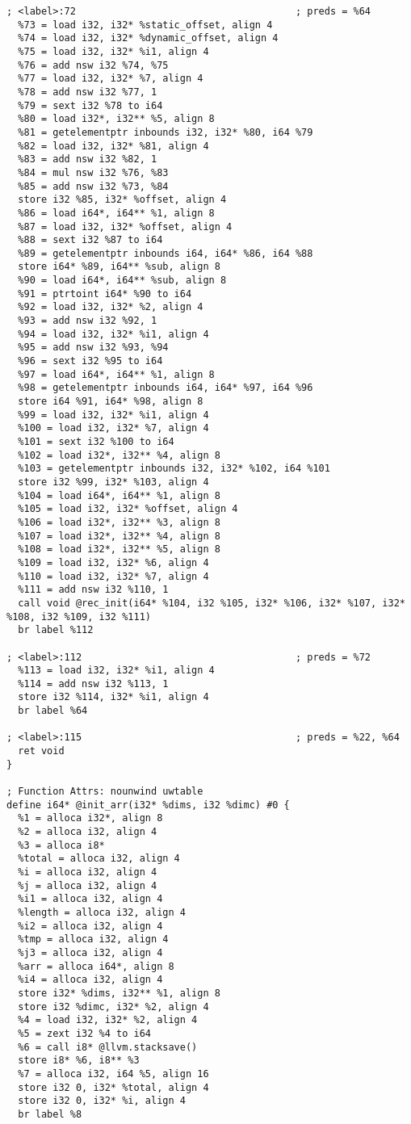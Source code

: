 \begin{verbatim}
; <label>:72                                      ; preds = %64
  %73 = load i32, i32* %static_offset, align 4
  %74 = load i32, i32* %dynamic_offset, align 4
  %75 = load i32, i32* %i1, align 4
  %76 = add nsw i32 %74, %75
  %77 = load i32, i32* %7, align 4
  %78 = add nsw i32 %77, 1
  %79 = sext i32 %78 to i64
  %80 = load i32*, i32** %5, align 8
  %81 = getelementptr inbounds i32, i32* %80, i64 %79
  %82 = load i32, i32* %81, align 4
  %83 = add nsw i32 %82, 1
  %84 = mul nsw i32 %76, %83
  %85 = add nsw i32 %73, %84
  store i32 %85, i32* %offset, align 4
  %86 = load i64*, i64** %1, align 8
  %87 = load i32, i32* %offset, align 4
  %88 = sext i32 %87 to i64
  %89 = getelementptr inbounds i64, i64* %86, i64 %88
  store i64* %89, i64** %sub, align 8
  %90 = load i64*, i64** %sub, align 8
  %91 = ptrtoint i64* %90 to i64
  %92 = load i32, i32* %2, align 4
  %93 = add nsw i32 %92, 1
  %94 = load i32, i32* %i1, align 4
  %95 = add nsw i32 %93, %94
  %96 = sext i32 %95 to i64
  %97 = load i64*, i64** %1, align 8
  %98 = getelementptr inbounds i64, i64* %97, i64 %96
  store i64 %91, i64* %98, align 8
  %99 = load i32, i32* %i1, align 4
  %100 = load i32, i32* %7, align 4
  %101 = sext i32 %100 to i64
  %102 = load i32*, i32** %4, align 8
  %103 = getelementptr inbounds i32, i32* %102, i64 %101
  store i32 %99, i32* %103, align 4
  %104 = load i64*, i64** %1, align 8
  %105 = load i32, i32* %offset, align 4
  %106 = load i32*, i32** %3, align 8
  %107 = load i32*, i32** %4, align 8
  %108 = load i32*, i32** %5, align 8
  %109 = load i32, i32* %6, align 4
  %110 = load i32, i32* %7, align 4
  %111 = add nsw i32 %110, 1
  call void @rec_init(i64* %104, i32 %105, i32* %106, i32* %107, i32* %108, i32 %109, i32 %111)
  br label %112

; <label>:112                                     ; preds = %72
  %113 = load i32, i32* %i1, align 4
  %114 = add nsw i32 %113, 1
  store i32 %114, i32* %i1, align 4
  br label %64

; <label>:115                                     ; preds = %22, %64
  ret void
}

; Function Attrs: nounwind uwtable
define i64* @init_arr(i32* %dims, i32 %dimc) #0 {
  %1 = alloca i32*, align 8
  %2 = alloca i32, align 4
  %3 = alloca i8*
  %total = alloca i32, align 4
  %i = alloca i32, align 4
  %j = alloca i32, align 4
  %i1 = alloca i32, align 4
  %length = alloca i32, align 4
  %i2 = alloca i32, align 4
  %tmp = alloca i32, align 4
  %j3 = alloca i32, align 4
  %arr = alloca i64*, align 8
  %i4 = alloca i32, align 4
  store i32* %dims, i32** %1, align 8
  store i32 %dimc, i32* %2, align 4
  %4 = load i32, i32* %2, align 4
  %5 = zext i32 %4 to i64
  %6 = call i8* @llvm.stacksave()
  store i8* %6, i8** %3
  %7 = alloca i32, i64 %5, align 16
  store i32 0, i32* %total, align 4
  store i32 0, i32* %i, align 4
  br label %8


\end{verbatim}

